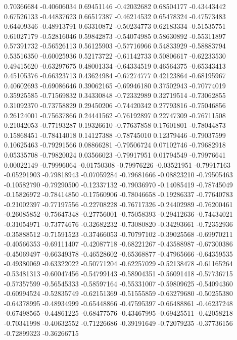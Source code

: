 0.70366684   -0.40606034 
0.69451146   -0.42032682 
0.68504177   -0.43443442 
0.67526133   -0.44837623 
0.66517387   -0.46214532 
0.65478324   -0.47573483 
0.64409346   -0.48913791 
0.63310872   -0.50234773 
0.62183334   -0.51535751 
0.61027179   -0.52816046 
0.59842873   -0.54074985 
0.58630892   -0.55311897 
0.57391732   -0.56526113 
0.56125903   -0.57716966 
0.54833929   -0.58883794 
0.53516350   -0.60025936 
0.52173722   -0.61142733 
0.50806617   -0.62233530 
0.49415620   -0.63297675 
0.48001334   -0.64334519 
0.46564375   -0.65343413 
0.45105376   -0.66323713 
0.43624984   -0.67274777 
0.42123864   -0.68195967 
0.40602693   -0.69086646 
0.39062165   -0.69946180 
0.37502943   -0.70774019 
0.35925585   -0.71569832 
0.34330848   -0.72332989 
0.32719514   -0.73062855 
0.31092370   -0.73758829 
0.29450206   -0.74420342 
0.27793816   -0.75046856 
0.26124001   -0.75637866 
0.24441562   -0.76192897 
0.22747309   -0.76711508 
0.21042053   -0.77193287 
0.19326610   -0.77637858 
0.17601801   -0.78044873 
0.15868451   -0.78414018 
0.14127388   -0.78745010 
0.12379446   -0.79037599 
0.10625463   -0.79291566 
0.08866281   -0.79506724 
0.07102746   -0.79682918 
0.05335708   -0.79820024 
0.03566023   -0.79917951 
0.01794549   -0.79976641 
0.00022149   -0.79996064 
-0.01750308  -0.79976226 
-0.03521951  -0.79917163 
-0.05291903  -0.79818943 
-0.07059284  -0.79681666 
-0.08823210  -0.79505463 
-0.10582790  -0.79290500 
-0.12337132  -0.79036970 
-0.14085419  -0.78745049 
-0.15826972  -0.78414850 
-0.17560906  -0.78046658 
-0.19286337  -0.77640783 
-0.21002397  -0.77197556 
-0.22708228  -0.76717326 
-0.24402989  -0.76200461 
-0.26085852  -0.75647348 
-0.27756001  -0.75058393 
-0.29412636  -0.74434021 
-0.31054971  -0.73774676 
-0.32682232  -0.73080820 
-0.34293661  -0.72352936 
-0.35888512  -0.71591523 
-0.37466053  -0.70797102 
-0.39025568  -0.69970211 
-0.40566353  -0.69111407 
-0.42087718  -0.68221267 
-0.43588987  -0.67300386 
-0.45069497  -0.66349378 
-0.46528602  -0.65368877 
-0.47965666  -0.64359535 
-0.49380069  -0.63322022 
-0.50771204  -0.62257029 
-0.52138478  -0.61165264 
-0.53481313  -0.60047456 
-0.54799143  -0.58904351 
-0.56091418  -0.57736715 
-0.57357599  -0.56545333 
-0.58597164  -0.55331007 
-0.59809625  -0.54094360 
-0.60994524  -0.52835749 
-0.62151369  -0.51555859 
-0.63279680  -0.50255380 
-0.64378995  -0.48934999 
-0.65448866  -0.47595397 
-0.66488861  -0.46237248 
-0.67498565  -0.44861225 
-0.68477576  -0.43467995 
-0.69425511  -0.42058218 
-0.70341998  -0.40632552 
-0.71226686  -0.39191649 
-0.72079235  -0.37736156 
-0.72899323  -0.36266715 
